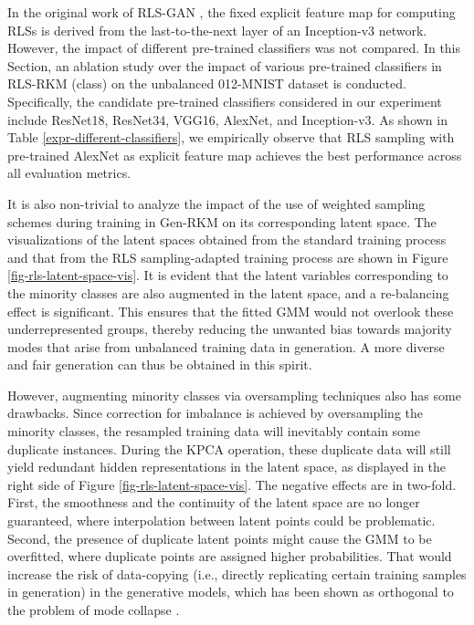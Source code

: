 \begin{description}[leftmargin=0pt]
    \item[Ablation study on different pre-trained classifiers ] In the original work of RLS-GAN \cite{schreursLeverageScoreSampling2022}, the fixed explicit feature map for computing RLSs is derived from the last-to-the-next layer of an Inception-v3 network. However, the impact of different pre-trained classifiers was not compared. In this Section, an ablation study over the impact of various pre-trained classifiers in RLS-RKM (class) on the unbalanced 012-MNIST dataset is conducted. Specifically, the candidate pre-trained classifiers considered in our experiment include ResNet18\cite{heDeepResidualLearning2016}, ResNet34\cite{heDeepResidualLearning2016}, VGG16\cite{simonyanVeryDeepConvolutional2015}, AlexNet\cite{krizhevskyImageNetClassificationDeep2012}, and Inception-v3\cite{szegedyRethinkingInceptionArchitecture2016}. As shown in Table \ref{expr-different-classifiers}, we empirically observe that RLS sampling with pre-trained AlexNet as explicit feature map achieves the best performance across all evaluation metrics.

    

    \item[Effect of weighted sampling on latent space in Gen-RKM ] It is also non-trivial to analyze the impact of the use of weighted sampling schemes during training in Gen-RKM on its corresponding latent space. The visualizations of the latent spaces obtained from the standard training process and that from the RLS sampling-adapted training process are shown in Figure \ref{fig-rls-latent-space-vis}. It is evident that the latent variables corresponding to the minority classes are also augmented in the latent space, and a re-balancing effect is significant. This ensures that the fitted GMM would not overlook these underrepresented groups, thereby reducing the unwanted bias towards majority modes that arise from unbalanced training data in generation. A more diverse and fair generation can thus be obtained in this spirit.

    \indent However, augmenting minority classes via oversampling techniques also has some drawbacks. Since correction for imbalance is achieved by oversampling the minority classes, the resampled training data will inevitably contain some duplicate instances. During the KPCA operation, these duplicate data will still yield redundant hidden representations in the latent space, as displayed in the right side of Figure \ref{fig-rls-latent-space-vis}. The negative effects are in two-fold. First, the smoothness and the continuity of the latent space are no longer guaranteed, where interpolation between latent points could be problematic. Second, the presence of duplicate latent points might cause the GMM to be overfitted, where duplicate points are assigned higher probabilities. That would increase the risk of data-copying (i.e., directly replicating certain training samples in generation) in the generative models, which has been shown as orthogonal to the problem of mode collapse \cite{bhattacharjeeDatacopyingGenerativeModels2023}.  


\end{description}
